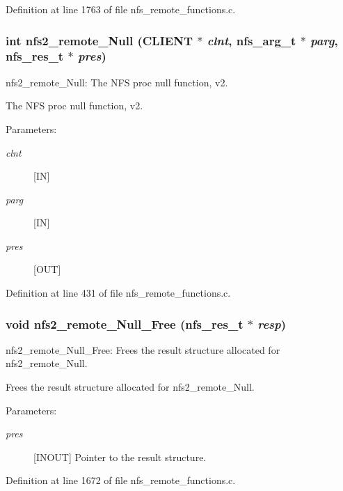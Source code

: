 Definition at line 1763 of file nfs\_\-remote\_\-functions.c.
\subsubsection{\setlength{\rightskip}{0pt plus 5cm}int nfs2\_\-remote\_\-Null (CLIENT $\ast$ {\em clnt}, nfs\_\-arg\_\-t $\ast$ {\em parg}, nfs\_\-res\_\-t $\ast$ {\em pres})}\label{group__NFSprocs_ga0}


nfs2\_\-remote\_\-Null: The NFS proc null function, v2.

The NFS proc null function, v2.

\begin{Desc}
\item[Parameters:]
\begin{description}
\item[{\em clnt}][IN] \item[{\em parg}][IN] \item[{\em pres}][OUT] \end{description}
\end{Desc}


Definition at line 431 of file nfs\_\-remote\_\-functions.c.
\subsubsection{\setlength{\rightskip}{0pt plus 5cm}void nfs2\_\-remote\_\-Null\_\-Free (nfs\_\-res\_\-t $\ast$ {\em resp})}\label{group__NFSprocs_ga54}


nfs2\_\-remote\_\-Null\_\-Free: Frees the result structure allocated for nfs2\_\-remote\_\-Null.

Frees the result structure allocated for nfs2\_\-remote\_\-Null.

\begin{Desc}
\item[Parameters:]
\begin{description}
\item[{\em pres}][INOUT] Pointer to the result structure. \end{description}
\end{Desc}


Definition at line 1672 of file nfs\_\-remote\_\-functions.c.
